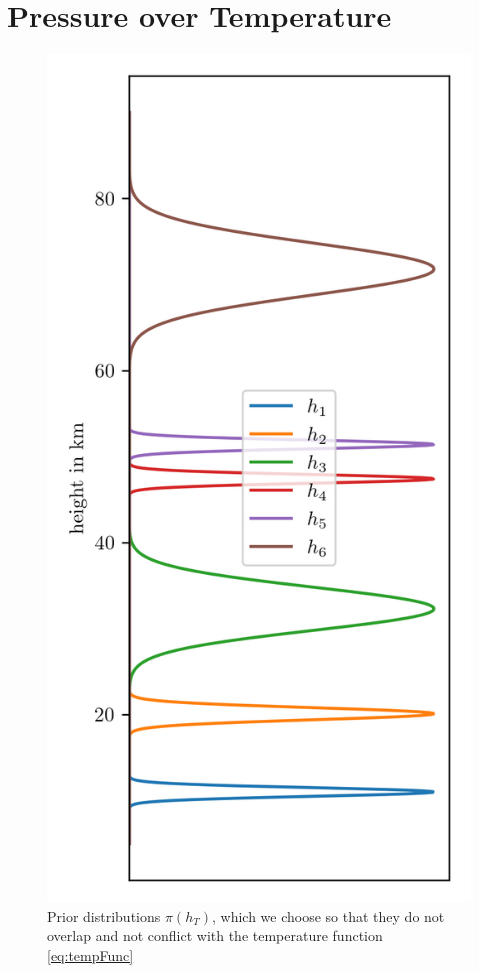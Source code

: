 \section{Pressure over Temperature}
\begin{figure}[ht!]
	\centering
	\includegraphics{HeightPriors.png}
	\caption[Prior distributions $\pi(h_T)$.]{Prior distributions $\pi(h_T)$, which we choose so that they do not overlap and not conflict with the temperature function \ref{eq:tempFunc}}
	\label{fig:HeightPriors}
\end{figure} 


